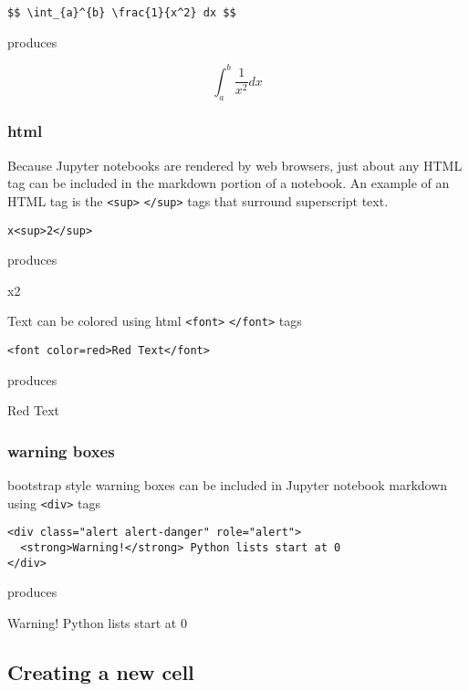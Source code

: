 \documentclass{book}
\newcommand{\passthrough}[1]{#1}
\begin{document}
\begin{lstlisting}
$$ \int_{a}^{b} \frac{1}{x^2} dx $$
\end{lstlisting}

produces

\[ \int_{a}^{b} \frac{1}{x^2} dx \]

\hypertarget{html}{%
\subsubsection{html}\label{html}}

Because Jupyter notebooks are rendered by web browsers, just about any
HTML tag can be included in the markdown portion of a notebook. An
example of an HTML tag is the \passthrough{\lstinline!<sup>!}
\passthrough{\lstinline!</sup>!} tags that surround superscript text.

\begin{lstlisting}
x<sup>2</sup>
\end{lstlisting}

produces

x2

Text can be colored using html \passthrough{\lstinline!<font>!}
\passthrough{\lstinline!</font>!} tags

\begin{lstlisting}
<font color=red>Red Text</font>
\end{lstlisting}

produces

Red Text

\hypertarget{warning-boxes}{%
\subsubsection{warning boxes}\label{warning-boxes}}

bootstrap style warning boxes can be included in Jupyter notebook
markdown using \passthrough{\lstinline!<div>!} tags

\begin{lstlisting}
<div class="alert alert-danger" role="alert">
  <strong>Warning!</strong> Python lists start at 0
</div>
\end{lstlisting}

produces

Warning! Python lists start at 0
    




    
        \hypertarget{creating-a-new-cell}{%
\subsection{Creating a new cell}\label{creating-a-new-cell}}
\end{document}
